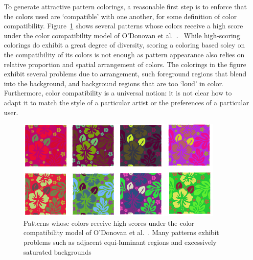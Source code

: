 To generate attractive pattern colorings, a reasonable first step is to enforce that the colors used are `compatible' with one another, for some definition of color compatibility. Figure~\ref{fig:ColorCompatOnly} shows several patterns whose colors receive a high score under the color compatibility model of O'Donovan et al.~.~ While high-scoring colorings do exhibit a great degree of diversity, scoring a coloring based soley on the compatibility of its colors is not enough as pattern appearance also relies on relative proportion and spatial arrangement of colors. The colorings in the figure exhibit several problems due to arrangement, such foreground regions that blend into the background, and background regions that are too `loud' in color. Furthermore, color compatibility is a universal notion: it is not clear how to adapt it to match the style of a particular artist or the preferences of a particular user.



\begin{figure}[htb]
\centering
\includegraphics[width=\columnwidth]{figs/colorCompatOnly.png}
\caption{Patterns whose colors receive high scores under the color compatibility model of O'Donovan et al.~. Many patterns exhibit problems such as adjacent equi-luminant regions and excessively saturated backgrounds}
\label{fig:ColorCompatOnly}
\end{figure}


